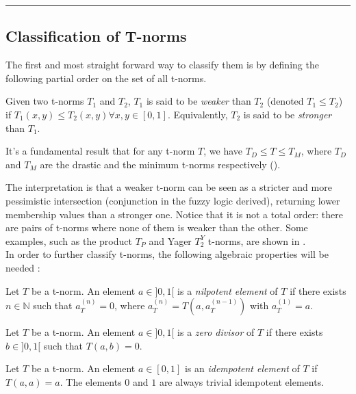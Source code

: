 \noindent\rule{\textwidth}{2pt}


\subsection{Classification of T-norms}
The first and most straight forward way to classify them is by defining the following partial order on the set of all t-norms. 
\begin{definition}
  Given two t-norms $T_1$ and $T_2$, $T_1$ is said to be \emph{weaker} than $T_2$ (denoted $T_1 \leq T_2$) if $T_1(x,y) \leq T_2(x,y) \forall x,y \in [0,1]$.
  Equivalently, $T_2$ is said to be \emph{stronger} than $T_1$.
\end{definition}

\begin{remark}
  It's a fundamental result that for any t-norm $T$, we have $T_D \leq T \leq T_M$, where $T_D$ and $T_M$ are the drastic and the minimum t-norms respectively (\cite[Rem.~1.5]{Klement2000}).
\end{remark}

The interpretation is that a weaker t-norm can be seen as a stricter and more pessimistic intersection (conjunction in the fuzzy logic derived), returning lower membership values than a stronger one. Notice that it is not a total order: there are pairs of t-norms where none of them is weaker than the other. Some examples, such as the product $T_P$ and Yager $T_2^Y$ t-norms, are shown in \cite[Fig.~6.1]{Klement2000}.\\


In order to further classify t-norms, the following algebraic properties will be needed \cite[Def.~2.1]{Klement2000}:

\begin{definition}
Let $T$ be a t-norm. An element $a \in ]0,1[$ is a \emph{nilpotent element} of $T$ if there exists $n \in \mathbb{N}$ such that $a_T^{(n)} = 0$, where $a_T^{(n)} = T(a, a_T^{(n-1)})$ with $a_T^{(1)}=a$.
\end{definition}

\begin{definition}
Let $T$ be a t-norm. An element $a \in ]0,1[$ is a \emph{zero divisor} of $T$ if there exists $b \in ]0,1[$ such that $T(a,b)=0$.
\end{definition}

\begin{definition}
  Let $T$ be a t-norm. An element $a \in [0,1]$ is an \emph{idempotent element} of $T$ if $T(a,a)=a$. The elements $0$ and $1$ are always trivial idempotent elements.
  \end{definition}
  

